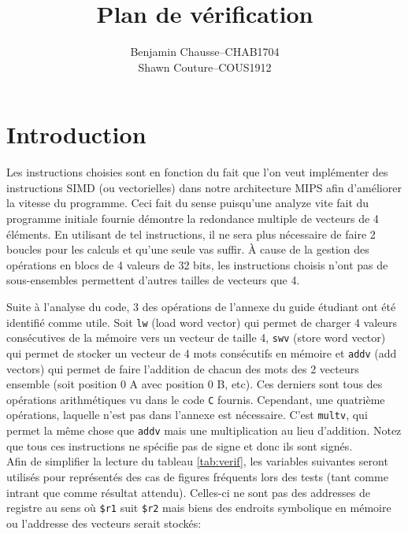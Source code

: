 \documentclass[a11paper]{article}
\title{Plan de vérification}
\author{
  \addtolength{\tabcolsep}{-0.4em}
  \begin{tabular}{rcl} %
      Benjamin Chausse & -- & CHAB1704 \\
      Shawn Couture    & -- & COUS1912 \\
  \end{tabular}
}
\begin{document}
\maketitle
\newpage

\section{Introduction}
Les instructions choisies sont en fonction du fait que l'on veut implémenter des instructions SIMD (ou vectorielles) dans notre architecture MIPS afin d'améliorer
la vitesse du programme. Ceci fait du sense puisqu'une analyze vite fait du programme initiale fournie démontre la redondance multiple de vecteurs de 4 éléments.
En utilisant de tel instructions, il ne sera plus nécessaire de faire 2 boucles pour les calculs et qu'une seule vas suffir. À cause de la gestion des opérations en blocs de 4 valeurs de 32 bits, les instructions choisis n'ont pas de sous-ensembles permettent d'autres tailles de vecteurs que 4.

Suite à l'analyse du code, 3 des opérations de l'annexe du guide étudiant ont été identifié comme utile. Soit \verb|lw| (load word vector) qui permet de charger 4 valeurs consécutives de la mémoire vers un vecteur de taille 4, \verb|swv| (store word vector) qui permet de stocker un vecteur de 4 mots consécutifs en mémoire et \verb|addv| (add vectors) qui permet de faire l'addition de chacun des mots des 2 vecteurs ensemble (soit position 0 A avec position 0 B, etc). Ces derniers sont tous des opérations arithmétiques vu dans le code \verb|C| fournis. Cependant, une quatrième opérations, laquelle n'est pas dans l'annexe est nécessaire. C'est \verb|multv|, qui permet la même chose que \verb|addv| mais une multiplication au lieu d'addition. Notez que tous ces instructions ne spécifie pas de signe et donc ils sont signés. \\


Afin de simplifier la lecture du tableau \ref{tab:verif}, les variables
suivantes seront utilisés pour représentés des cas de figures fréquents lors
des tests (tant comme intrant que comme résultat attendu). Celles-ci ne sont
pas des addresses de registre au sens où \verb|$r1| suit \verb|$r2| mais biens
des endroits symbolique en mémoire ou l'addresse des vecteurs serait stockés:
\end{document}
